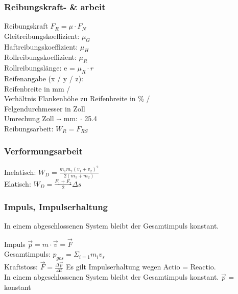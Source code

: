 \begin{multicols}{2}
\subsubsection{Reibungskraft- \& arbeit}
Reibungskraft $F_{R} = \mu \cdot F_{N}$ \\
Gleitreibungskoeffizient: $\mu_{G}$\\
Haftreibungskoeffizient: $\mu_{H}$ \\
Rollreibungskoeffizient: $\mu_{R}$ \\
Rollreibungslänge: e = $\mu_R \cdot r$ \\
Reifenangabe (x / y / z): \\
Reifenbreite in mm / \\
Verhältnis Flankenhöhe zu Reifenbreite in \% / \\
Felgendurchmesser in Zoll \\
Umrechung Zoll $\overrightarrow{}$ mm: $\cdot$ 25.4 \\
Reibungsarbeit: $W_{R} = F_{RS}$

\subsubsection{Verformungsarbeit}
Inelatisch: $W_{D} = \frac{m_{1}m_{2}(v_{1} + v_{2})^2}{2(m_{1} + m_{2})} $ \\
Elatisch:  $W_{D} = \frac{F_{1} + F_{2}}{2}\Delta s$

\subsubsection{Impuls, Impulserhaltung}
In einem abgeschlossenen System bleibt der Gesamtimpuls konstant. 

Impuls $ \overrightarrow{p} = m \cdot \overrightarrow{v} = \overrightarrow{F} $  \\
Gesamtimpuls: $ p_{ges} = \Sigma_{i = 1} m_{i}v_{s} $\\
Kraftstoss: $\overrightarrow{F} = \frac{\Delta \overrightarrow{p}}{ \Delta t}$
Es gilt Impulserhaltung wegen Actio = Reactio. \\
In einem abgeschlossenen System bleibt der Gesamtimpuls konstant. $\overrightarrow{p}$ = konstant 


\end{multicols}

